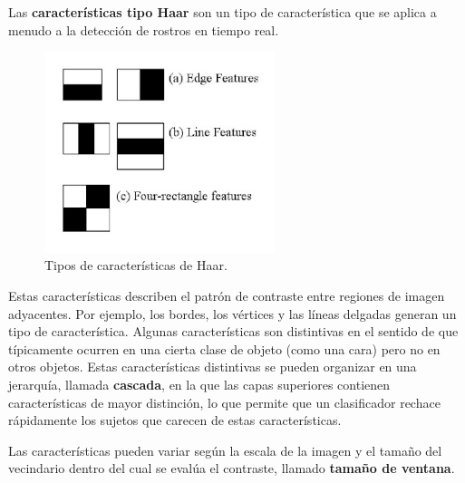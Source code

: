 \documentclass[a4paper]{article}
\begin{document}
Las \textbf{características tipo Haar} son un tipo de característica que se aplica a menudo a la detección de rostros en tiempo real. 
\begin{figure}[h!]
    \centering
    \includegraphics[width=0.6\textwidth]{../img/haar_feat.png}
    \caption{Tipos de características de Haar.}
\end{figure}

Estas características describen el patrón de contraste entre regiones de imagen adyacentes. Por ejemplo, los bordes, los vértices y las líneas delgadas generan un tipo de característica. Algunas características son distintivas en el sentido de que típicamente ocurren en una cierta clase de objeto (como una cara) pero no en otros objetos. Estas características distintivas se pueden organizar en una jerarquía, llamada \textbf{cascada}, en la que las capas superiores contienen características de mayor distinción, lo que permite que un clasificador rechace rápidamente los sujetos que carecen de estas características.

Las características pueden variar según la escala de la imagen y el tamaño del vecindario dentro del cual se evalúa el contraste, llamado \textbf{tamaño de ventana}. 
\end{document}
